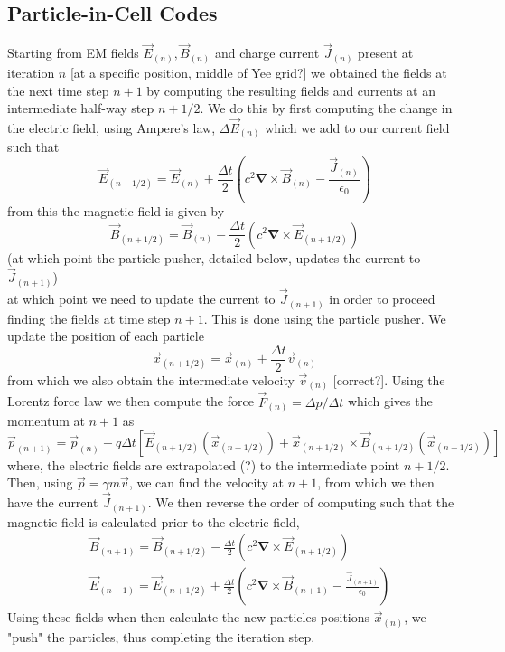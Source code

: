 \begin{itemize}
\section{Particle-in-Cell Codes}
\label{sec:Particle-in-Cell Codes}
Starting from EM fields $\vec{E}_{(n)},\vec{B}_{(n)}$ and charge current $\vec{J}_{(n)}$ present at iteration $n$ [at a specific position, middle of Yee grid?] we obtained the fields at the next time step $n+1$ by computing the resulting fields and currents at an intermediate half-way step $n+1/2$. We do this by first computing the change in the electric field, using Ampere's law, $\Delta \vec{E}_{(n)}$ which we add to our current field such that
\begin{equation}
\vec{E}_{(n+1/2)}=\vec{E}_{(n)}+\frac{\Delta t}{2}\left(c^2\mathbf{\nabla}\times \vec{B}_{(n)}-\frac{\vec{J}_{(n)}}{\epsilon_0}\right)
\end{equation}
from this the magnetic field is given by
\begin{equation}
\vec{B}_{(n+1/2)}=\vec{B}_{(n)}-\frac{\Delta t}{2}\left(c^2\mathbf{\nabla}\times \vec{E}_{(n+1/2)}\right)
\end{equation}
(at which point the particle pusher, detailed below, updates the current to $\vec{J}_{(n+1)}$)\\
at which point we need to update the current to $\vec{J}_{(n+1)}$ in order to proceed finding the fields at time step $n+1$. This is done using the particle pusher. We update the position of each particle 
\begin{equation}
\vec{x}_{(n+1/2)}=\vec{x}_{(n)}+\frac{\Delta t}{2}\vec{v}_{(n)}
\end{equation}
from which we also obtain the intermediate velocity $\vec{v}_{(n)}$ [correct?]. Using the Lorentz force law we then compute the force $\vec{F}_{(n)}=\Delta p/\Delta t$ which gives the momentum at $n+1$ as
\begin{equation}
\vec{p}_{(n+1)}=\vec{p}_{(n)}+q\Delta t\left[\vec{E}_{(n+1/2)}\left(\vec{x}_{(n+1/2)}\right)+\vec{x}_{(n+1/2)}\times\vec{B}_{(n+1/2)}\left(\vec{x}_{(n+1/2)}\right) \right]
\end{equation}
where, the electric fields are extrapolated (?) to the intermediate point $n+1/2$. Then, using $\vec{p}=\gamma m \vec{v}$, we can find the velocity at $n+1$, from which we then have the current $\vec{J}_{(n+1)}$. We then reverse the order of computing such that the magnetic field is calculated prior to the electric field,
\begin{align}
&\vec{B}_{(n+1)}=\vec{B}_{(n+1/2)}-\frac{\Delta t}{2}\left(c^2\mathbf{\nabla}\times \vec{E}_{(n+1/2)}\right)\\
&\vec{E}_{(n+1)}=\vec{E}_{(n+1/2)}+\frac{\Delta t}{2}\left(c^2\mathbf{\nabla}\times \vec{B}_{(n+1)}-\frac{\vec{J}_{(n+1)}}{\epsilon_0}\right)
\end{align}
Using these fields when then calculate the new particles positions $\vec{x}_{(n)}$, we "push" the particles, thus completing the iteration step.









\end{itemize}
